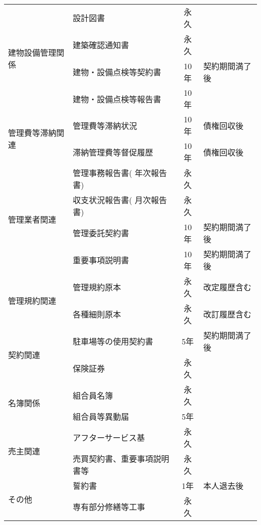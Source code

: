 \documentclass[12pt,uplatex]{jsarticle}
\begin{document}
\begin{table}[htbp]
{\begin{tabular}{|l|l|c|l|}
                                \hline
      \multirow{4}{*}{建物設備管理関係} & 設計図書 & 永久 & \\ \cline{2-4}
                                & 建築確認通知書 & 永久 & \\ \cline{2-4}
                                & 建物・設備点検等契約書 & 10年 & 契約期間満了後 \\ \cline{2-4}
                                & 建物・設備点検等報告書 & 10年 & \\ \cline{2-4}
                                \hline
      \multirow{2}{*}{管理費等滞納関連} & 管理費等滞納状況 & 10年 &  債権回収後 \\ \cline{2-4}
                                & 滞納管理費等督促履歴 & 10年 & 債権回収後\\ \cline{2-4}
                                \hline
      \multirow{4}{*}{管理業者関連} & 管理事務報告書( 年次報告書) & 永久 & \\ \cline{2-4}
                                & 収支状況報告書( 月次報告書) & 永久 & \\ \cline{2-4}
                                & 管理委託契約書 & 10年 & 契約期間満了後 \\ \cline{2-4}
                                &  重要事項説明書 & 10年 & 契約期間満了後 \\ \cline{2-4}
                                \hline
      \multirow{2}{*}{管理規約関連} & 管理規約原本 & 永久 & 改定履歴含む \\ \cline{2-4}
                                & 各種細則原本 & 永久 & 改訂履歴含む \\ \cline{2-4}
                                \hline
      \multirow{2}{*}{契約関連} & 駐車場等の使用契約書 & 5年 & 契約期間満了後 \\ \cline{2-4}
                                &  保険証券 & 永久 &  \\ \cline{2-4}
                                \hline
      \multirow{2}{*}{名簿関係} & 組合員名簿 & 永久 &  \\ \cline{2-4}
                                &  組合員等異動届 & 5年 &  \\ \cline{2-4}
                                \hline
      \multirow{2}{*}{売主関連} & アフターサービス基 & 永久 &  \\ \cline{2-4}
                                & 売買契約書、重要事項説明書等 & 永久 &  \\ \cline{2-4}
                                \hline
      \multirow{2}{*}{その他} & 誓約書 & 1年 & 本人退去後 \\ \cline{2-4}
                                &  専有部分修繕等工事 & 永久 & \\ \cline{2-4}
                                \hline
    \end{tabular}
  }
\end{table}
\end{document}
